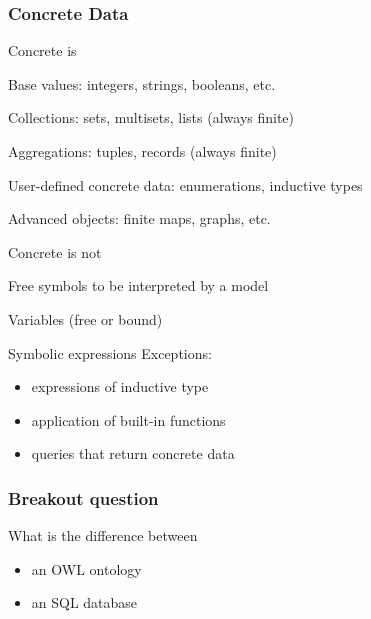 \begin{frame}\frametitle{Concrete Data}
\begin{blockitems}{Concrete is}
\item Base values: integers, strings, booleans, etc.
\item Collections: sets, multisets, lists (always finite)
\item Aggregations: tuples, records (always finite)
\item User-defined concrete data: enumerations, inductive types
\item Advanced objects: finite maps, graphs, etc.
\end{blockitems}

\begin{blockitems}{Concrete is not}
\item Free symbols to be interpreted by a model
\item Variables (free or bound)
\item Symbolic expressions
 Exceptions:
  \begin{itemize}
  \item expressions of inductive type
  \item application of built-in functions
  \item queries that return concrete data
  \end{itemize}
\end{blockitems}
\end{frame}

\begin{frame}\frametitle{Breakout question}
What is the difference between
\begin{itemize}
\item an OWL ontology
\item an SQL database
\end{itemize}
\end{frame}

